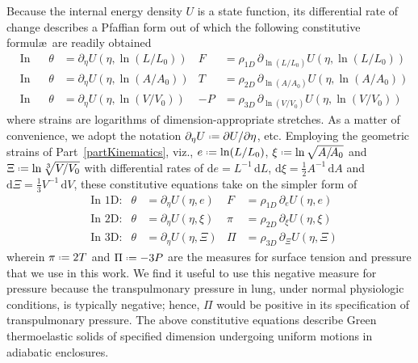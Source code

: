 Because the internal energy density $U$ is a state function, its differential rate of change describes a Pfaffian form \cite{Caratheodory09} out of which the following constitutive formul\ae\ are readily obtained
\begin{subequations}
    \label{GreenElasticCEs}
    \begin{align}
    \mbox{} & \text{In 1D:} & 
    \theta & = \partial_{\eta} U ( \eta , \ln (L/L_0)) &
    F & = \rho_{1D} \, \partial_{\ln(L/L_0)} U ( \eta , \ln (L/L_0) ) \\
    \mbox{} & \text{In 2D:} &
    \theta & = \partial_{\eta} U ( \eta , \ln (A / \! A_0) ) &
    T & = \rho_{2D} \, \partial_{\ln (A / \! A_0)} U ( \eta , \ln (A / A_0) ) \\
    \mbox{} & \text{In 3D:} &
    \theta & = \partial_{\eta} U ( \eta , \ln (V \! / V_0) ) &
    -P & = \rho_{3D} \, \partial_{\ln (V \! / V_0)} U ( \eta , \ln (V \! / V_0) )
    \end{align}
\end{subequations}
where strains are logarithms of dimension-appropriate stretches.  As a matter of convenience, we adopt the notation $\partial_{\eta} U \defeq \partial U / \partial \eta$, etc.  Employing the geometric strains of Part~\ref{partKinematics}, viz., $e \defeq \ln ( L / L_0 )$, $\xi \defeq \ln \sqrt{ A / \! A_0 }$ and $\Xi \defeq \ln \sqrt[3]{V \! / V_0}$ with differential rates of $\mathrm{d} e = L^{-1} \, \mathrm{d}L$, $\mathrm{d} \xi = \tfrac{1}{2} A^{-1} \, \mathrm{d}A$ and $\mathrm{d} \Xi = \tfrac{1}{3} V^{-1} \, \mathrm{d}V$, these constitutive equations take on the simpler form of
\begin{subequations}
    \label{uniformCEs}
    \begin{align}
    \mbox{} & \text{In 1D:} & 
    \theta & = \partial_{\eta} U ( \eta , e) &
    F & = \rho_{1D} \, \partial_e U ( \eta , e ) \\
    \mbox{} & \text{In 2D:} &
    \theta & = \partial_{\eta} U ( \eta , \xi ) &
    \pi & = \rho_{2D} \, \partial_{\xi} U ( \eta , \xi ) \\
    \mbox{} & \text{In 3D:} &
    \theta & = \partial_{\eta} U ( \eta , \Xi ) &
    \Pi & = \rho_{3D} \, \partial_{\Xi} U ( \eta , \Xi )
    \end{align}
\end{subequations}
wherein $\pi \defeq 2T$ and $\Pi \defeq -3P$ are the measures for surface tension and pressure that we use in this work.  We find it useful to use this negative measure for pressure because the transpulmonary pressure in lung, under normal physiologic conditions, is typically negative; hence, $\Pi$ would be positive in its specification of transpulmonary pressure.  The above constitutive equations describe Green thermo\-elastic solids of specified dimension undergoing uniform motions in adiabatic enclosures.

